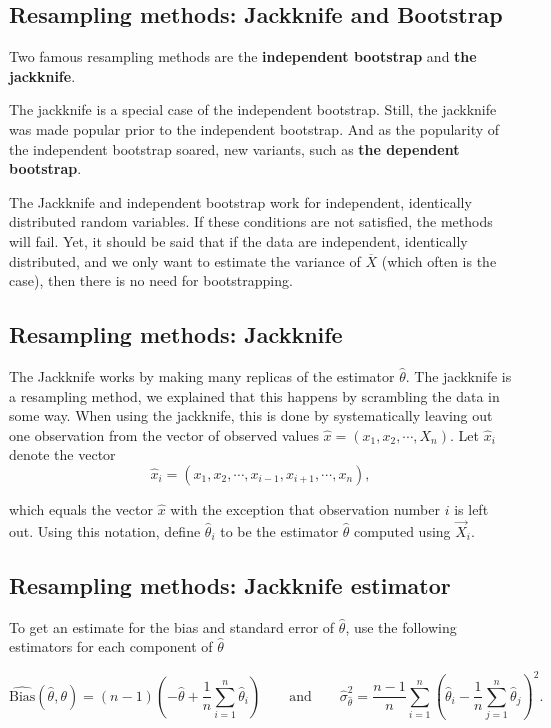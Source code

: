 \subsection*{Resampling methods: Jackknife and Bootstrap}

Two famous
resampling methods are the \textbf{independent bootstrap} and \textbf{the jackknife}. 

The jackknife is a special case of the independent bootstrap. Still, the jackknife was made
popular prior to the independent bootstrap. And as the popularity of
the independent bootstrap soared, new variants, such as \textbf{the dependent bootstrap}.

The Jackknife and independent bootstrap work for
independent, identically distributed random variables.
If these conditions are not
satisfied, the methods will fail.  Yet, it should be said that if the data are
independent, identically distributed, and we only want to estimate the
variance of $\overline{X}$ (which often is the case), then there is no
need for bootstrapping. 

\subsection*{Resampling methods: Jackknife}

The Jackknife works by making many replicas of the estimator $\widehat{\theta}$. 
The jackknife is a resampling method, we explained that this happens by scrambling the data in some way. When using the jackknife, this is done by systematically leaving out one observation from the vector of observed values $\hat{x} = (x_1,x_2,\cdots,X_n)$. 
Let $\hat{x}_i$ denote the vector
\[
\hat{x}_i = (x_1,x_2,\cdots,x_{i-1},x_{i+1},\cdots,x_n),
\]

which equals the vector $\hat{x}$ with the exception that observation
number $i$ is left out. Using this notation, define
$\widehat{\theta}_i$ to be the estimator
$\widehat{\theta}$ computed using $\vec{X}_i$. 

\subsection*{Resampling methods: Jackknife estimator}

To get an estimate for the bias and
standard error of $\widehat{\theta}$, use the following
estimators for each component of $\widehat{\theta}$

\[
\widehat{\mathrm{Bias}}(\widehat \theta,\theta) = (n-1)\left( - \widehat{\theta} + \frac{1}{n}\sum_{i=1}^{n} \widehat \theta_i \right) \qquad \text{and} \qquad \widehat{\sigma}^2_{\widehat{\theta} } = \frac{n-1}{n}\sum_{i=1}^{n}( \widehat{\theta}_i - \frac{1}{n}\sum_{j=1}^{n}\widehat \theta_j )^2.
\]

